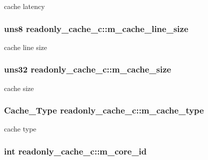 \label{classreadonly__cache__c_aeb1e6fce6d78c38e6380f63723dd61a0}
cache latency \hypertarget{classreadonly__cache__c_a1159ba39733659b1437142c5d7ed1c4e}{
\subsubsection[{m\_\-cache\_\-line\_\-size}]{\setlength{\rightskip}{0pt plus 5cm}uns8 {\bf readonly\_\-cache\_\-c::m\_\-cache\_\-line\_\-size}}}
\label{classreadonly__cache__c_a1159ba39733659b1437142c5d7ed1c4e}
cache line size \hypertarget{classreadonly__cache__c_ab63998be492167f946e18aeb53daa14c}{
\subsubsection[{m\_\-cache\_\-size}]{\setlength{\rightskip}{0pt plus 5cm}uns32 {\bf readonly\_\-cache\_\-c::m\_\-cache\_\-size}}}
\label{classreadonly__cache__c_ab63998be492167f946e18aeb53daa14c}
cache size \hypertarget{classreadonly__cache__c_a84e49e7c8da3be313a17d738810686b2}{
\subsubsection[{m\_\-cache\_\-type}]{\setlength{\rightskip}{0pt plus 5cm}Cache\_\-Type {\bf readonly\_\-cache\_\-c::m\_\-cache\_\-type}}}
\label{classreadonly__cache__c_a84e49e7c8da3be313a17d738810686b2}
cache type \hypertarget{classreadonly__cache__c_aa9d46b912ab4891761ec80c32b78fe10}{
\subsubsection[{m\_\-core\_\-id}]{\setlength{\rightskip}{0pt plus 5cm}int {\bf readonly\_\-cache\_\-c::m\_\-core\_\-id}}}
